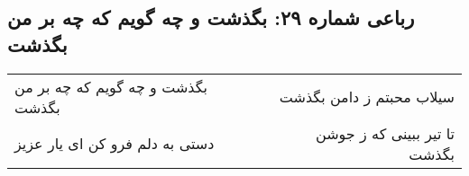 \begin{center}
\section*{رباعی شماره ۲۹: بگذشت و چه گویم که چه بر من بگذشت}
\label{sec:029}
\begin{longtable}{l p{0.5cm} r}
بگذشت و چه گویم که چه بر من بگذشت
&&
سیلاب محبتم ز دامن بگذشت
\\
دستی به دلم فرو کن ای یار عزیز
&&
تا تیر ببینی که ز جوشن بگذشت
\\
\end{longtable}
\end{center}
